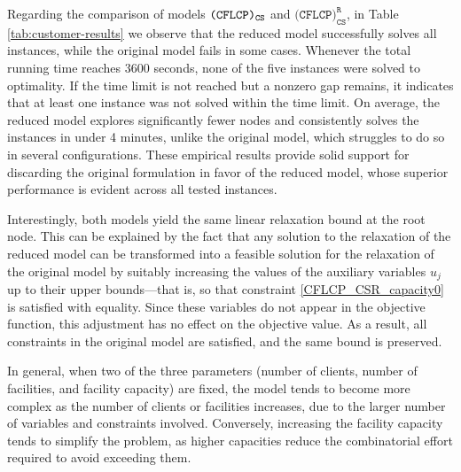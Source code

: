 \documentclass[preprint,11pt,authoryear]{elsarticle}
\begin{document}
Regarding the comparison of models ${\normalfont\texttt{(CFLCP)}_{\texttt{CS}}}$ and $\texttt{(CFLCP)}_{\texttt{CS}}^\texttt{R}$, in Table \ref{tab:customer-results} we observe that the reduced model successfully solves all instances, while the original model fails in some cases. Whenever the total running time reaches 3600 seconds, none of the five instances were solved to optimality. If the time limit is not reached but a nonzero gap remains, it indicates that at least one instance was not solved within the time limit. On average, the reduced model explores significantly fewer nodes and consistently solves the instances in under 4 minutes, unlike the original model, which struggles to do so in several configurations. These empirical results provide solid support for discarding the original formulation in favor of the reduced model, whose superior performance is evident across all tested instances.

Interestingly, both models yield the same linear relaxation bound at the root node. This can be explained by the fact that any solution to the relaxation of the reduced model can be transformed into a feasible solution for the relaxation of the original model by suitably increasing the values of the auxiliary variables \(u_j\) up to their upper bounds—that is, so that constraint \eqref{CFLCP_CSR_capacity0} is satisfied with equality. Since these variables do not appear in the objective function, this adjustment has no effect on the objective value. As a result, all constraints in the original model are satisfied, and the same bound is preserved.

In general, when two of the three parameters (number of clients, number of facilities, and facility capacity) are fixed, the model tends to become more complex as the number of clients or facilities increases, due to the larger number of variables and constraints involved. Conversely, increasing the facility capacity tends to simplify the problem, as higher capacities reduce the combinatorial effort required to avoid exceeding them.
\end{document}
